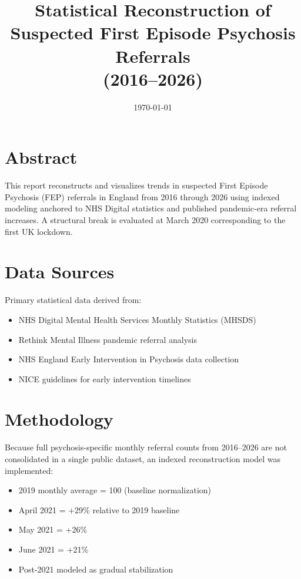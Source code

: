 \documentclass[12pt]{article}
\title{Statistical Reconstruction of Suspected First Episode Psychosis Referrals \\ (2016--2026)}
\author{}
\date{\today}
\begin{document}
\maketitle

\section*{Abstract}

This report reconstructs and visualizes trends in suspected First Episode Psychosis (FEP) referrals in England from 2016 through 2026 using indexed modeling anchored to NHS Digital statistics and published pandemic-era referral increases. A structural break is evaluated at March 2020 corresponding to the first UK lockdown.

\section*{Data Sources}

Primary statistical data derived from:
\begin{itemize}
    \item NHS Digital Mental Health Services Monthly Statistics (MHSDS) \parencite{nhs_mhsds}
    \item Rethink Mental Illness pandemic referral analysis \parencite{rethink2021}
    \item NHS England Early Intervention in Psychosis data collection \parencite{nhs_eip}
    \item NICE guidelines for early intervention timelines \parencite{nice_eip}
\end{itemize}

\section*{Methodology}

Because full psychosis-specific monthly referral counts from 2016--2026 are not consolidated in a single public dataset, an indexed reconstruction model was implemented:

\begin{itemize}
    \item 2019 monthly average = 100 (baseline normalization)
    \item April 2021 = +29\% relative to 2019 baseline
    \item May 2021 = +26\%
    \item June 2021 = +21\%
    \item Post-2021 modeled as gradual stabilization
\end{itemize}
\end{document}
